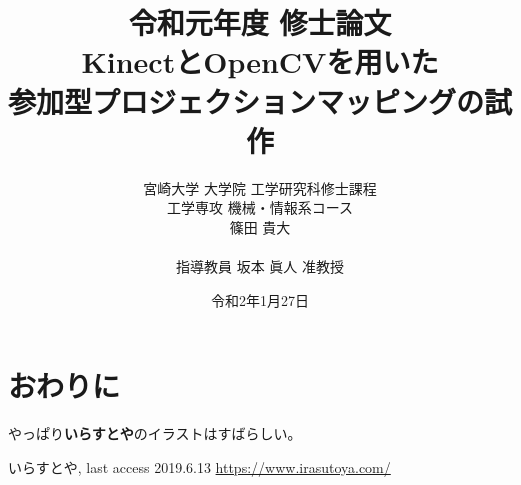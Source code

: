 \documentclass[uplatex,a4paper,12pt,onecolumn,oneside,openany]{jsbook}
\title{
{\Large 令和元年度 修士論文} \\[4cm]
\LARGE KinectとOpenCVを用いた
     \\参加型プロジェクションマッピングの試作 \\[4cm]
}
\author{宮崎大学 大学院 工学研究科修士課程\\
工学専攻 機械・情報系コース\\
篠田 貴大\\
\\
指導教員 坂本 眞人 准教授
}
\date{令和2年1月27日}
\begin{document}
\maketitle

\clearpage

\renewcommand{\thepage}{\roman{page}}


{\makeatletter
\let\ps@jpl@in\ps@empty
\makeatother
\pagestyle{plain}

\tableofcontents
\listoffigures
\listoftables
\pagestyle{fancy}
\clearpage}








\section{おわりに}
やっぱり{\bf いらすとや}のイラストはすばらしい。

\begin{thebibliography}{99}
     いらすとや, last access 2019.6.13 \url{https://www.irasutoya.com/}



\end{thebibliography}
\end{document}
